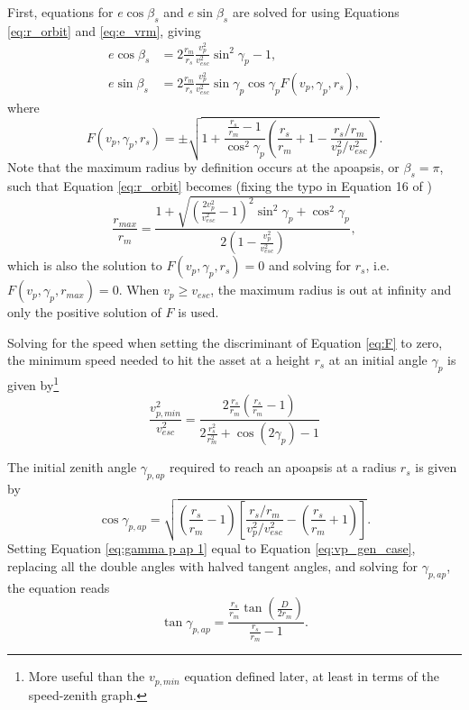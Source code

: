 \documentclass{article}
\begin{document}
First, equations for $e\cos\beta_s$ and $e\sin\beta_s$ are solved for using Equations \eqref{eq:r_orbit} and \eqref{eq:e_vrm}, giving
\begin{align}\label{eq:ecosbetas}
e\cos\beta_s &= 2\frac{r_m}{r_s}\frac{v_p^2}{v_{esc}^2}\sin^2\gamma_p - 1,\\
e\sin\beta_s &= 2\frac{r_m}{r_s}\frac{v_p^2}{v_{esc}^2}\sin\gamma_p\cos\gamma_p F(v_p,\gamma_p,r_s), \label{eq:esinbetas}
\end{align}
where
\begin{equation}\label{eq:F}
F(v_p,\gamma_p,r_s) = \pm\sqrt{1 + \frac{\frac{r_s}{r_m}-1}{\cos^2\gamma_p}\left(\frac{r_s}{r_m}+1-\frac{r_s/r_m}{v_p^2/v_{esc}^2}\right)}.
\end{equation}
Note that the maximum radius by definition occurs at the apoapsis, or $\beta_s=\pi$, such that Equation \eqref{eq:r_orbit} becomes (fixing the typo in Equation 16 of \cite{gault1963spray})
\begin{equation}\label{eq:rmax}
\frac{r_{max}}{r_m} = \frac{1 + \sqrt{\left(\frac{2v_p^2}{v_{esc}^2}-1\right)^2\sin^2\gamma_p+\cos^2\gamma_p}}{2\left(1-\frac{v_p^2}{v_{esc}^2}\right)},
\end{equation}
which is also the solution to $F(v_p,\gamma_p,r_s) = 0$ and solving for $r_s$, i.e.\ $F(v_p,\gamma_p,r_{max}) = 0$. When $v_p \ge v_{esc}$, the maximum radius is out at infinity and only the positive solution of $F$ is used.

Solving for the speed when setting the discriminant of Equation \eqref{eq:F} to zero, the minimum speed needed to hit the asset at a height $r_s$ at an initial angle $\gamma_p$ is given by\footnote{More useful than the $v_{p,min}$ equation defined later, at least in terms of the speed-zenith graph.}
\begin{equation}\label{eq:vpmin}
\frac{v_{p,min}^2}{v_{esc}^2} = \frac{2\frac{r_s}{r_m}\left(\frac{r_s}{r_m}-1\right)}{2\frac{r_s^2}{r_m^2}+\cos(2\gamma_p)-1}
\end{equation}

The initial zenith angle $\gamma_{p,ap}$ required to reach an apoapsis at a radius $r_s$ is given by
\begin{equation}\label{eq:gamma p ap 1}
\cos\gamma_{p,ap} = \sqrt{\left(\frac{r_s}{r_m}-1\right)\left[\frac{r_s/r_m}{v_p^2/v_{esc}^2}-\left(\frac{r_s}{r_m}+1\right)\right]}.
\end{equation}
Setting Equation \eqref{eq:gamma p ap 1} equal to Equation \eqref{eq:vp_gen_case}, replacing all the double angles with halved tangent angles, and solving for $\gamma_{p,ap}$, the equation reads
\begin{equation}
\tan\gamma_{p,ap} = \frac{\frac{r_s}{r_m}\tan\left(\frac{D}{2r_m}\right)}{\frac{r_s}{r_m}-1}.
\end{equation}
\end{document}
